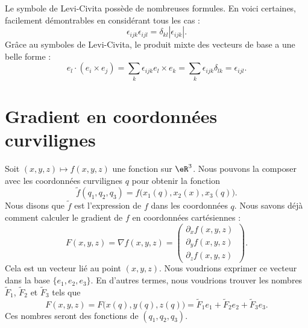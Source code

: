 Le symbole de Levi-Civita possède de nombreuses formules. En voici certaines, facilement démontrables en considérant tous les cas :
\begin{equation}
    \epsilon_{ijk}\epsilon_{ijl}=\delta_{kl}| \epsilon_{ijk} |.
\end{equation}
Grâce au symboles de Levi-Civita, le produit mixte des vecteurs de base a une belle forme :
\begin{equation}        \label{EqProdMixteepsilonCicivr}
    e_l\cdot(e_i\times e_j)=\sum_k\epsilon_{ijk}e_l\times e_k=\sum_k\epsilon_{ijk}\delta_{lk}=\epsilon_{ijl}.
\end{equation}

\section{Gradient en coordonnées curvilignes}

Soit $(x,y,z)\mapsto f(x,y,z)$ une fonction sur $\eR^3$. Nous pouvons la composer avec les coordonnées curvilignes $q$ pour obtenir la fonction
\begin{equation}
    \tilde f(q_1,q_2,q_3)=f\big( x_1(q),x_2(x),x_3(q) \big).
\end{equation}
Nous disons que $\tilde f$ est l'expression de $f$ dans les coordonnées $q$. Nous savons déjà comment calculer le gradient de $f$ en coordonnées cartésiennes :
\begin{equation}
    F(x,y, z)=\nabla f(x,y,z)=\begin{pmatrix}
        \partial_xf(x,y,z)    \\ 
        \partial_yf(x,y,z)    \\ 
        \partial_zf(x,y,z)    \
    \end{pmatrix}.
\end{equation}
Cela est un vecteur lié au point $(x,y,z)$. Nous voudrions exprimer ce vecteur dans la base $\{ e_1,e_2,e_3 \}$. En d'autres termes, nous voudrions trouver les nombres $\tilde F_1$, $\tilde F_2$ et $\tilde F_3$ tels que
\begin{equation}
    F(x,y,z)=F\big( x(q),y(q),z(q) \big)=\tilde F_1e_1+\tilde F_2e_2+\tilde F_3e_3.
\end{equation}
Ces nombres seront des fonctions de $(q_1,q_2,q_3)$.

